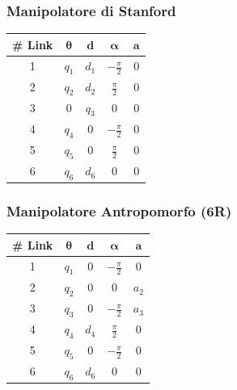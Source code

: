 ﻿\documentclass[11pt, a4paper]{article}
\begin{document}
\begin{minipage}[t]{0.48\textwidth}
    \subsubsection*{Manipolatore di Stanford}
    \centering
    \begin{tabular}{|c|c|c|c|c|}
        \hline
        \textbf{\# Link} & \(\boldsymbol{\theta}\) & \(\boldsymbol{d}\) & \(\boldsymbol{\alpha}\) & \(\boldsymbol{a}\) \\
        \hline
        1 & \(q_{1}\) & \(d_{1}\) & \(-\frac{\pi}{2}\) & 0 \\
        \hline
        2 & \(q_{2}\) & \(d_{2}\) & \(\frac{\pi}{2}\) & 0 \\
        \hline
        3 & 0 & \(q_{3}\) & 0 & 0 \\
        \hline
        4 & \(q_{4}\) & 0 & \(-\frac{\pi}{2}\) & 0 \\
        \hline
        5 & \(q_{5}\) & 0 & \(\frac{\pi}{2}\) & 0 \\
        \hline
        6 & \(q_{6}\) & \(d_{6}\) & 0 & 0 \\
        \hline
    \end{tabular}
\end{minipage}
\hfill
\begin{minipage}[t]{0.48\textwidth}
    \subsubsection*{Manipolatore Antropomorfo (6R)}
    \centering
    \begin{tabular}{|c|c|c|c|c|}
        \hline
        \textbf{\# Link} & \(\boldsymbol{\theta}\) & \(\boldsymbol{d}\) & \(\boldsymbol{\alpha}\) & \(\boldsymbol{a}\) \\
        \hline
        1 & \(q_{1}\) & 0 & \(-\frac{\pi}{2}\) & 0 \\
        \hline
        2 & \(q_{2}\) & 0 & 0 & \(a_{2}\) \\
        \hline
        3 & \(q_{3}\) & 0 & \(-\frac{\pi}{2}\) & \(a_{3}\) \\
        \hline
        4 & \(q_{4}\) & \(d_{4}\) & \(\frac{\pi}{2}\) & 0 \\
        \hline
        5 & \(q_{5}\) & 0 & \(-\frac{\pi}{2}\) & 0 \\
        \hline
        6 & \(q_{6}\) & \(d_{6}\) & 0 & 0 \\
        \hline
    \end{tabular}
\end{minipage}
\end{document}
